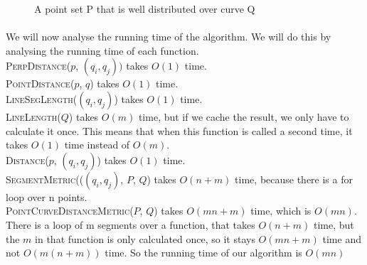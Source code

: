 \documentclass[a4paper,11pt]{article}
\begin{document}
\begin{figure}[H]
	\centering
	\def\svgwidth{0.5\textwidth}
	
	\caption{A point set P that is well distributed over curve Q}
	\label{fig:line-weight}
\end{figure}

 
	
\paragraph{}
We will now analyse the running time of the algorithm. 
We will do this by analysing the running time of each function.\\
\textsc{PerpDistance}($p$, $(q_i, q_j))$ takes $O(1)$ time.\\
\textsc{PointDistance}($p$, $q$) takes $O(1)$ time. \\
\textsc{LineSegLength}($(q_i, q_j)$) takes $O(1)$ time. \\
\textsc{LineLength}($Q$) takes $O(m)$ time, but if we cache the result, we only have to calculate it once. This means that when this function is called a second time, it takes $O(1)$ time instead of $O(m)$.\\
\textsc{Distance}($p$, $(q_i, q_j)$) takes $O(1)$ time.\\
\textsc{SegmentMetric}(($(q_i, q_j)$, $P$, $Q$) takes $O(n+m)$ time, because there is a for loop over n points. \\
\textsc{PointCurveDistanceMetric}($P$, $Q$)  takes $O(mn + m)$ time, which is $O(mn)$. 
There is a loop of m segments over a function, that takes $O(n+m)$ time, but the $m$ in that function is only calculated once, so it stays $O(mn+m)$ time and not $O(m(n+m))$ time.
So the running time of our algorithm is  $O(mn)$ \\
\end{document}
